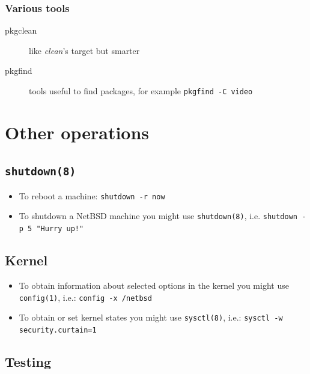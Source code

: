 \documentclass[notumble]{leaflet}
\newcommand{\man}[1]{\mbox{\texttt{#1}}}
\newcommand{\NetBSD}{\mbox{NetBSD}}
\begin{document}
\subsubsection{Various tools}
\begin{description}
\item[pkgclean] like \emph{clean}'s target but smarter
\item[pkgfind] tools useful to find packages, for example
\verb|pkgfind -C video|
\end{description}


\section{Other operations}
\subsection{\man{shutdown(8)}}
\begin{itemize}
\item To reboot a machine: \verb|shutdown -r now|
\item To shutdown a \NetBSD{} machine you might use \man{shutdown(8)}, i.e.
\verb|shutdown -p 5 "Hurry up!"|
\end{itemize}
\subsection{Kernel}
\begin{itemize}
\item To obtain information about selected options in the kernel you might use 
\man{config(1)}, i.e.: \verb|config -x /netbsd|
\item To obtain or set kernel states you might use
\man{sysctl(8)}, i.e.: \verb|sysctl -w security.curtain=1|
\end{itemize}
\subsection{Testing}
\end{document}

